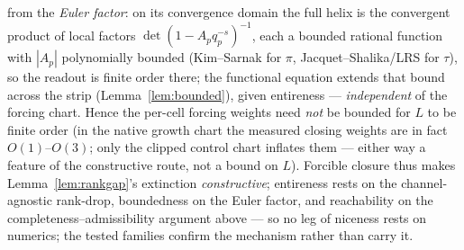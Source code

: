 \documentclass[11pt]{article}
\theoremstyle{definition}
\begin{document}
from the \emph{Euler factor}: on its convergence domain the full helix is the convergent product of local factors
$\det(1-A_{p}q_p^{-s})^{-1}$, each a bounded rational function with $|A_p|$ polynomially bounded (Kim--Sarnak for $\pi$, Jacquet--Shalika/LRS for $\tau$),
so the readout is finite order there; the functional equation extends that bound across the strip
(Lemma~\ref{lem:bounded}), given entireness --- \emph{independent} of the forcing chart. Hence the per-cell
forcing weights need \emph{not} be bounded for $L$ to be finite order (in the native growth chart the measured
closing weights are in fact $O(1)$--$O(3)$; only the clipped control chart inflates them --- either way a
feature of the constructive route, not a bound on $L$). Forcible closure
thus makes Lemma~\ref{lem:rankgap}'s extinction \emph{constructive}; entireness rests on the channel-agnostic
rank-drop, boundedness on the Euler factor, and reachability on the completeness--admissibility argument above ---
so no leg of niceness rests on numerics; the tested families confirm the mechanism rather than carry it.
\end{document}
